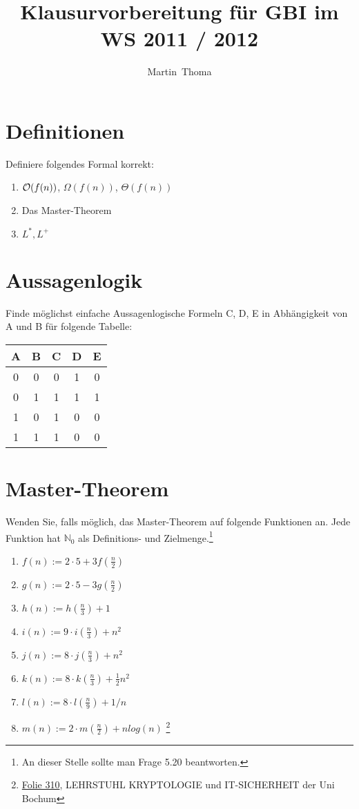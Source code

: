 \documentclass[a4paper,12pt]{article}
\newcommand{\Nachname}{Thoma}
\newcommand{\Vorname}{Martin}
\begin{document}
\title{Klausurvorbereitung für GBI im WS 2011 / 2012}
\author{\Vorname~\Nachname}

\section{Definitionen}
Definiere folgendes Formal korrekt:

\begin{enumerate}
  \item ${\cal O}(f(n))$,  $\Omega(f(n))$,  $\Theta(f(n))$
  \item Das Master-Theorem
  \item $L^*, L^+$
\end{enumerate}

\section{Aussagenlogik}
Finde möglichst einfache Aussagenlogische Formeln C, D, E in Abhängigkeit von A 
und B für folgende Tabelle:
\begin{table}[h]
	\begin{tabular}{| c | c  || c | c | c |}
	\hline
	\textbf{A} & \textbf{B} & C & D & E\\
	\hline
	\hline
	0 & 0 & 0 & 1 & 0\\
	\hline
	0 & 1 & 1 & 1 & 1\\
	\hline
	1 & 0 & 1 & 0 & 0\\
	\hline
	1 & 1 & 1 & 0 & 0\\
	\hline
	\end{tabular}
\end{table}

\section{Master-Theorem}
Wenden Sie, falls möglich, das Master-Theorem auf folgende Funktionen an. Jede 
Funktion hat $\mathbb{N}_0$ als Definitions- und Zielmenge.\footnote{An dieser Stelle sollte man Frage 5.20 beantworten.}
\begin{enumerate}
  \item $f(n) := 2 \cdot 5 + 3 f(\frac{n}{2})$
  \item $g(n) := 2 \cdot 5 - 3 g(\frac{n}{2})$
  \item $h(n) := h(\frac{n}{3}) + 1$
  \item $i(n) := 9 \cdot i(\frac{n}{3}) + n^2$
  \item $j(n) := 8 \cdot j(\frac{n}{3}) + n^2$
  \item $k(n) := 8 \cdot k(\frac{n}{3}) + \frac{1}{2} n^2$
  \item $l(n) := 8 \cdot l(\frac{n}{9}) + 1/n$
  \item $m(n) := 2 \cdot m(\frac{n}{2}) + n log(n)$ \footnote{\href{http://www.cits.rub.de/imperia/md/content/may/dima08/26_erzeugende.pdf}{Folie 310}, LEHRSTUHL KRYPTOLOGIE und IT-SICHERHEIT der Uni Bochum}
\end{enumerate}
\end{document}
